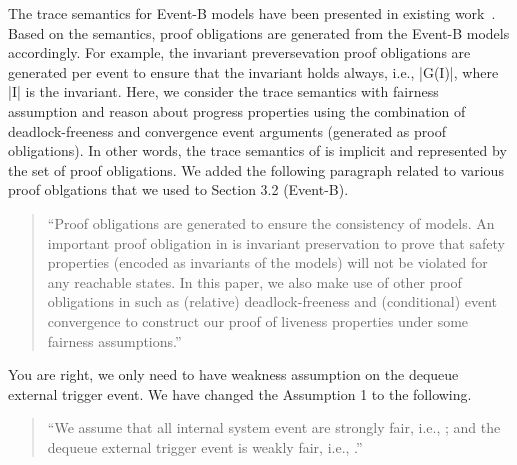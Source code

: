 \documentclass{response}
\begin{document}
\begin{response}
  The trace semantics for Event-B models have been presented in
  existing
  work~\cite{abrial10:_model_event_b,hoang2016ltl,hudon16:_unit_b_method}. Based
  on the semantics, proof obligations are generated from the Event-B
  models accordingly. For example, the invariant preversevation proof
  obligations are generated per event to ensure that the invariant
  holds always, i.e., |G(I)|, where |I| is the invariant. Here, we
  consider the trace semantics with fairness assumption and reason
  about progress properties using the combination of deadlock-freeness
  and convergence event arguments (generated as proof obligations). In
  other words, the trace semantics of \EventB is implicit and
  represented by the set of proof obligations.  We added the following
  paragraph related to various proof oblgations that we used to
  Section 3.2 (Event-B).
  \begin{quote}
    ``Proof obligations are generated to ensure the consistency of
  \mbox{\EventB} models.  An important proof obligation in
  \mbox{\EventB} is invariant preservation to prove that safety
  properties (encoded as invariants of the models) will not be violated
  for any reachable states. In this paper, we also make use of other
  proof obligations in \mbox{\EventB} such as (relative)
  deadlock-freeness and (conditional) event convergence to construct
  our proof of liveness properties under some fairness assumptions.''
  \end{quote}
\end{response}

\begin{comment}{Reviewer \#1}
- Proof of fairness properties. In order to deal with fairness properties
you advocate a strong fairness assumption. From my point a view, this
is a strong operating assumption. May be you could comment on that?
Last, but may be I am wrong, I have the intuition that weak fairness
for the events handling dequeuing external triggers would be enough?
Please could you comment?
\end{comment}

\begin{response}
  You are right, we only need to have weakness assumption on the
  dequeue external trigger event. We have changed the Assumption 1 to
  the following.  
  \begin{quote}
    ``We assume that all internal system event \mbox{}
    are strongly fair, i.e., \mbox{}; and the
    dequeue external trigger event is weakly fair, i.e.,
    \mbox{}.''
  \end{quote}
\end{response}
\end{document}
